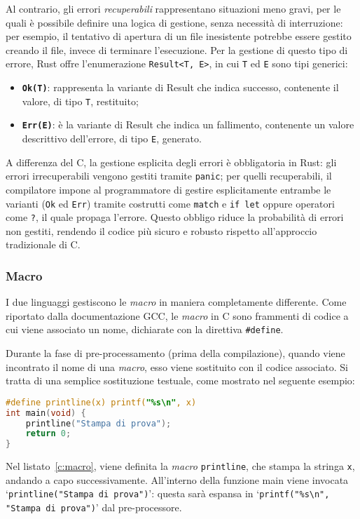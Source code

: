 Al contrario, gli errori \textit{recuperabili} rappresentano situazioni meno gravi, per le quali è possibile definire una logica di gestione, senza necessità di interruzione: per esempio, il tentativo di apertura di un file inesistente potrebbe essere gestito creando il file, invece di terminare l'esecuzione.
Per la gestione di questo tipo di errore, Rust offre l'enumerazione \texttt{Result<T, E>}, in cui \texttt{T} ed \texttt{E} sono tipi generici:
\begin{itemize}
    \item \texttt{\textbf{Ok(T)}}: rappresenta la variante di Result che indica successo, contenente il valore, di tipo \texttt{T}, restituito;
    \item \texttt{\textbf{Err(E)}}: è la variante di Result che indica un fallimento, contenente un valore descrittivo dell'errore, di tipo \texttt{E}, generato.
\end{itemize}
A differenza del C, la gestione esplicita degli errori è obbligatoria in Rust: gli errori irrecuperabili vengono gestiti tramite \texttt{panic}; per quelli recuperabili, il 
compilatore impone al programmatore di gestire esplicitamente entrambe le varianti (\texttt{Ok} ed \texttt{Err}) tramite costrutti come \texttt{match} e \texttt{if let} oppure operatori come \texttt{?}, il quale propaga l'errore. 
Questo obbligo riduce la probabilità di errori non gestiti, rendendo il codice più sicuro e robusto rispetto all'approccio tradizionale di C.

\subsubsection{Macro}
I due linguaggi gestiscono le \textit{macro} in maniera completamente differente.
Come riportato dalla documentazione GCC\cite{GNU-online-docs}, le \textit{macro} in C sono frammenti di codice a cui viene associato un nome, dichiarate con la direttiva \texttt{\#define}. 

Durante la fase di pre-processamento (prima della compilazione),
quando viene incontrato il nome di una \textit{macro}, esso viene sostituito con il codice associato. Si tratta di una semplice sostituzione testuale, come
mostrato nel seguente esempio:
\begin{lstlisting}[language=C, caption={Definizione di \textit{macro} in C}, label={c:macro}]
#define printline(x) printf("%s\n", x)
int main(void) {
    printline("Stampa di prova");
    return 0;
}
\end{lstlisting}
Nel listato~\ref{c:macro}, viene definita la \textit{macro} \texttt{printline}, che stampa la stringa \texttt{x}, andando a capo successivamente.
All'interno della funzione main viene invocata `\texttt{printline("Stampa di prova")}': questa sarà espansa in `\texttt{printf("\%s\textbackslash n", "Stampa di prova")}' dal pre-processore. 

